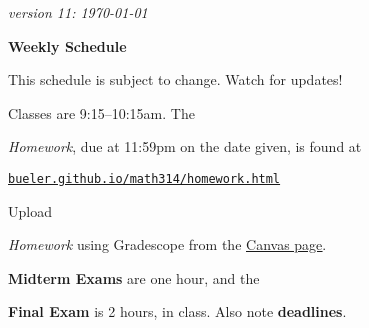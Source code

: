 \documentclass[12pt]{article}
\newcommand{\due}[1]{\strut {\color{BrickRed} \textsl{#1}}}
\newcommand{\ee}[1]{\strut {\color{Blue} \textbf{#1}}}
\newcommand{\dlinline}[1]{{\color{Purple} \textbf{#1}}}
\newcommand{\dl}[1]{{\small \dlinline{#1}}}
\begin{document}
\hfill \small \emph{version 11: \today} \normalsize

\bigskip\bigskip
\centerline{\Large \textbf{Weekly Schedule}}

\bigskip
This schedule is subject to change.  Watch for updates!

Classes are 9:15--10:15am.  The \due{Homework}, due at 11:59pm on the date given, is found at

 \quad \href{https://bueler.github.io/math314/homework.html}{\underline{\texttt{bueler.github.io/math314/homework.html}}}
 
Upload \due{Homework} using Gradescope from the \href{https://canvas.alaska.edu/courses/7017}{\underline{Canvas page}}.  \ee{Midterm Exams} are one hour, and the \ee{Final Exam} is 2 hours, in class.  Also note \dl{deadlines}.

\bigskip
\end{document}

